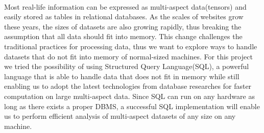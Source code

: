 
\paragraph{} Most real-life information can be expressed as multi-aspect data(tensors) and easily stored as tables in relational databases. As the scales of websites grow these years, the sizes of datasets are also growing rapidly,
thus breaking the assumption that all data should fit into memory. This change challenges the traditional practices for processing data, thus we want to explore ways to handle datasets that do not fit into memory of normal-sized machines.
For this project we tried the possibility of using Structured Query Language(SQL), a powerful language that is able to handle data that does not fit in memory while still enabling us to adopt the latest technologies from database
researches for faster computation on large multi-aspect data. Since SQL can run on any hardware as long as there exists a proper DBMS, a successful SQL implementation will enable us to perform efficient analysis of multi-aspect datasets
of any size on any machine.
